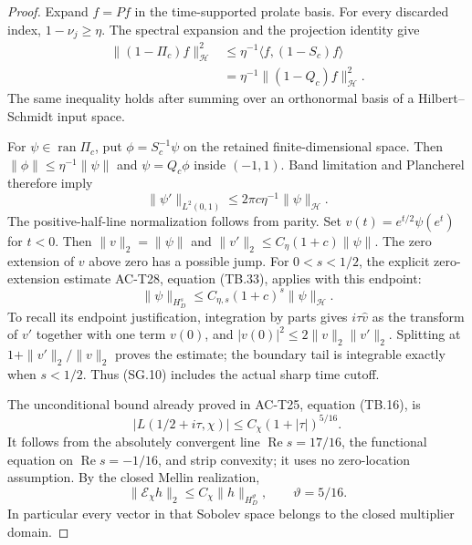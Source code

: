 \begin{proof}
Expand $f=Pf$ in the time-supported prolate basis.
For every discarded index, $1-\nu_j\geq\eta$.
The spectral expansion and the projection identity give
\[
 \begin{split}
 \|(1-\Pi_c)f\|_{\mathcal H}^2
 &\leq\eta^{-1}\langle f,(1-S_c)f\rangle\\
 &=\eta^{-1}\|(1-Q_c)f\|_{\mathcal H}^2.
 \end{split}                                        \tag{SG.8}
\]
The same inequality holds after summing over an
orthonormal basis of a Hilbert--Schmidt input space.

For $\psi\in\operatorname{ran}\Pi_c$, put
$\phi=S_c^{-1}\psi$ on the retained finite-dimensional
space.  Then $\|\phi\|\leq\eta^{-1}\|\psi\|$ and
$\psi=Q_c\phi$ inside $(-1,1)$.
Band limitation and Plancherel therefore imply
\[
       \|\psi'\|_{L^2(0,1)}
             \leq2\pi c\eta^{-1}\|\psi\|_{\mathcal H}.
                                                               \tag{SG.9}
\]
The positive-half-line normalization follows from parity.
Set $v(t)=e^{t/2}\psi(e^t)$ for $t<0$.
Then $\|v\|_2=\|\psi\|$ and
$\|v'\|_2\leq C_\eta(1+c)\|\psi\|$.
The zero extension of $v$ above zero has a possible jump.
For $0<s<1/2$, the explicit zero-extension estimate
AC-T28, equation (TB.33), applies with this endpoint:
\[
 \|\psi\|_{H_D^s}
   \leq C_{\eta,s}(1+c)^s\|\psi\|_{\mathcal H}.
                                                               \tag{SG.10}
\]
To recall its endpoint justification, integration by
parts gives $i\tau\widehat v$ as the transform of
$v'$ together with one term $v(0)$, and
$|v(0)|^2\leq2\|v\|_2\|v'\|_2$.
Splitting at $1+\|v'\|_2/\|v\|_2$ proves the estimate;
the boundary tail is integrable exactly when $s<1/2$.
Thus (SG.10) includes the actual sharp time cutoff.

The unconditional bound already proved in AC-T25,
equation (TB.16), is
\[
 |L(1/2+i\tau,\chi)|
                    \leq C_\chi(1+|\tau|)^{5/16}.
                                                               \tag{SG.11}
\]
It follows from the absolutely convergent line
$\operatorname{Re}s=17/16$, the functional equation
on $\operatorname{Re}s=-1/16$, and strip convexity;
it uses no zero-location assumption.
By the closed Mellin realization,
\[
       \|\mathcal E_\chi h\|_2
                      \leq C_\chi\|h\|_{H_D^{\vartheta}},
                  \qquad\vartheta=5/16.             \tag{SG.12}
\]
In particular every vector in that Sobolev space
belongs to the closed multiplier domain.


\end{proof}

